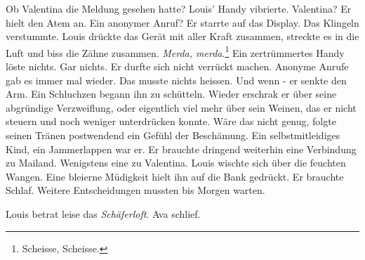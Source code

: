 \sectionbreak

Ob Valentina die Meldung gesehen hatte?
Louis’ Handy vibrierte. Valentina? Er hielt den Atem an. Ein anonymer Anruf?
Er starrte auf das Display. Das Klingeln verstummte.
Louis drückte das Gerät mit aller Kraft zusammen, streckte es in die
Luft und biss die Zähne zusammen. \emph{Merda, merda}.\footnote{Scheisse, Scheisse.}
Ein zertrümmertes Handy löste nichts. Gar nichts. Er durfte sich nicht
verrückt machen. Anonyme Anrufe gab es immer mal wieder. Das musste
nichts heissen. Und wenn - er senkte den Arm. Ein Schluchzen begann ihn
zu schütteln. Wieder erschrak er über seine abgründige Verzweiflung, oder eigentlich viel mehr 
über sein Weinen, das er nicht steuern und noch weniger unterdrücken konnte. 
Wäre das nicht genug, folgte seinen Tränen postwendend ein Gefühl der Beschämung. 
Ein selbstmitleidiges Kind, ein Jammerlappen war er.  
Er brauchte dringend weiterhin eine Verbindung zu Mailand.
Wenigstens eine zu Valentina. Louis wischte sich über die feuchten Wangen. 
Eine bleierne Müdigkeit hielt ihn auf die Bank gedrückt. Er brauchte Schlaf. Weitere Entscheidungen mussten bis Morgen warten.

Louis betrat leise das \emph{Schäferloft}. Ava schlief.
